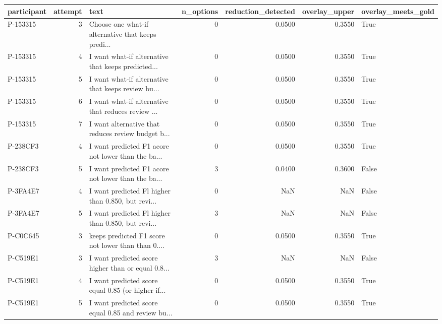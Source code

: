 \begin{tabular}{lrlrrrl}
\toprule
participant &  attempt &                                               text &  n\_options &  reduction\_detected &  overlay\_upper &  overlay\_meets\_gold \\
\midrule
   P-153315 &        3 & Choose one what-if alternative that keeps predi... &          0 &              0.0500 &         0.3550 &                True \\
   P-153315 &        4 & I want what-if alternative that keeps predicted... &          0 &              0.0500 &         0.3550 &                True \\
   P-153315 &        5 & I want what-if alternative that keeps review bu... &          0 &              0.0500 &         0.3550 &                True \\
   P-153315 &        6 & I want what-if alternative that reduces review ... &          0 &              0.0500 &         0.3550 &                True \\
   P-153315 &        7 & I want alternative that reduces review budget b... &          0 &              0.0500 &         0.3550 &                True \\
   P-238CF3 &        4 & I want predicted F1 acore not lower than the ba... &          0 &              0.0500 &         0.3550 &                True \\
   P-238CF3 &        5 & I want predicted F1 acore not lower than the ba... &          3 &              0.0400 &         0.3600 &               False \\
   P-3FA4E7 &        4 & I want predicted Fl higher than 0.850, but revi... &          0 &                 NaN &            NaN &               False \\
   P-3FA4E7 &        5 & I want predicted Fl higher than 0.850, but revi... &          3 &                 NaN &            NaN &               False \\
   P-C0C645 &        3 & keeps predicted F1 score not lower than than 0.... &          0 &              0.0500 &         0.3550 &                True \\
   P-C519E1 &        3 & I want predicted score higher than or equal 0.8... &          3 &                 NaN &            NaN &               False \\
   P-C519E1 &        4 & I want predicted score equal 0.85 (or higher if... &          0 &              0.0500 &         0.3550 &                True \\
   P-C519E1 &        5 & I want predicted score equal 0.85 and review bu... &          0 &              0.0500 &         0.3550 &                True \\

\end{tabular}
